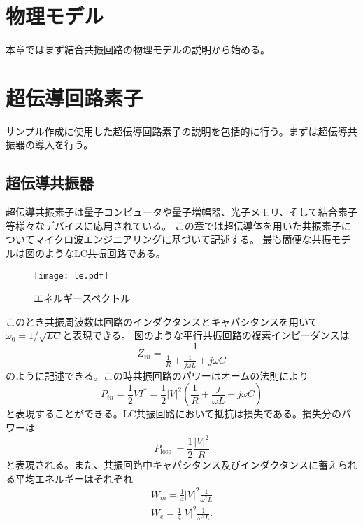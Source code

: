 \section{物理モデル}
    本章ではまず結合共振回路の物理モデルの説明から始める。
\section{超伝導回路素子}
    サンプル作成に使用した超伝導回路素子の説明を包括的に行う。まずは超伝導共振器の導入を行う。
    \subsection{超伝導共振器}
    超伝導共振素子は量子コンピュータ\cite*{Goppl2008}や量子増幅器、光子メモリ\cite*{Pierre2014}、そして結合素子\cite*{Baust2015,Reuther2009}等様々なデバイスに応用されている。
        この章では超伝導体を用いた共振素子についてマイクロ波エンジニアリングに基づいて記述する。\cite*{Microwave}
        最も簡便な共振モデルは図のようなLC共振回路である。
        \begin{figure}[H]
            \centering
            \texttt{[image: le.pdf]}
            \caption{エネルギースペクトル}
        \end{figure}
        このとき共振周波数は回路のインダクタンスとキャパシタンスを用いて$\omega_0=1/\sqrt{LC}$と表現できる。
        図のような平行共振回路の複素インピーダンスは
        \begin{equation}
            Z_{i n}=\frac{1}{\frac{1}{R}+\frac{1}{j \omega L}+j \omega C}
        \end{equation}
        のように記述できる。この時共振回路のパワーはオームの法則により
        \begin{equation}
            P_{i n}=\frac{1}{2} V I^{*}=\frac{1}{2}|V|^{2}\left(\frac{1}{R}+\frac{j}{\omega L}-j \omega C\right)
            \end{equation}
        と表現することができる。LC共振回路において抵抗は損失である。損失分のパワーは
        \begin{equation}
            P_{\text {loss }}=\frac{1}{2} \frac{|V|^{2}}{R}
        \end{equation}
        と表現される。また、共振回路中キャパシタンス及びインダクタンスに蓄えられる平均エネルギーはそれぞれ
        \begin{equation}
            \begin{array}{l}
            W_{m}=\frac{1}{4}|V|^{2} \frac{1}{\omega^{2} L} \\
            W_{e}=\frac{1}{4}|V|^{2} \frac{1}{\omega^{2} L} .
            \end{array}
            \end{equation}
